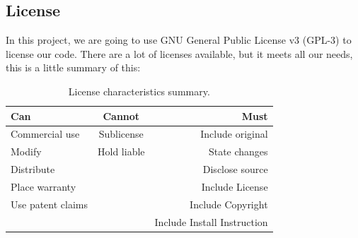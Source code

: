 \subsection{License}

In this project, we are going to use GNU General Public License v3 (GPL-3)
to license our code.
There are a lot of licenses available, but it meets all our needs,
this is a little summary of this:

\begin{table}[H]
  \centering
  \begin{tabular}{ l | c | r }
    Can &  Cannot & Must \\
    \hline
    Commercial use    & Sublicense    &  Include original \\
    Modify            & Hold liable   &  State changes \\
    Distribute        &               &  Disclose source \\
    Place warranty    &               &  Include License \\
    Use patent claims &               &  Include Copyright \\
                      &               &  Include Install Instruction \\
  \end{tabular}
  \caption{License characteristics summary.}
\end{table}
